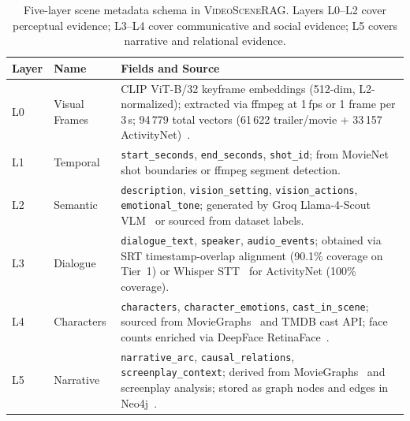 \documentclass[11pt]{article}
\newcommand{\system}{\textsc{VideoSceneRAG}}
\begin{document}
\begin{table}[!htb]
\centering
\begin{tabular}{%
  >{\raggedright\arraybackslash}p{1.2cm}
  >{\raggedright\arraybackslash}p{2.5cm}
  >{\raggedright\arraybackslash}p{7.9cm}}
\toprule
\textbf{Layer} & \textbf{Name} & \textbf{Fields and Source} \\
\midrule
L0 & Visual Frames   &
  CLIP ViT-B/32 keyframe embeddings (512-dim, L2-normalized); extracted
  via ffmpeg at 1\,fps or 1 frame per 3\,s; 94\,779 total vectors
  (61\,622 trailer/movie + 33\,157 ActivityNet)~\cite{clip,openclip}. \\[3pt]
L1 & Temporal        &
  \texttt{start\_seconds}, \texttt{end\_seconds}, \texttt{shot\_id}; from
  MovieNet~\cite{movienet} shot boundaries or ffmpeg segment detection. \\[3pt]
L2 & Semantic        &
  \texttt{description}, \texttt{vision\_setting}, \texttt{vision\_actions},
  \texttt{emotional\_tone}; generated by Groq Llama-4-Scout
  VLM~\cite{llava,blip2} or sourced from dataset labels. \\[3pt]
L3 & Dialogue        &
  \texttt{dialogue\_text}, \texttt{speaker}, \texttt{audio\_events}; obtained
  via SRT timestamp-overlap alignment (90.1\% coverage on Tier~1) or Whisper
  STT~\cite{whisper} for ActivityNet (100\% coverage). \\[3pt]
L4 & Characters      &
  \texttt{characters}, \texttt{character\_emotions},
  \texttt{cast\_in\_scene}; sourced from MovieGraphs~\cite{moviegraphs} and
  TMDB cast API; face counts enriched via DeepFace
  RetinaFace~\cite{retinaface}. \\[3pt]
L5 & Narrative       &
  \texttt{narrative\_arc}, \texttt{causal\_relations},
  \texttt{screenplay\_context}; derived from MovieGraphs~\cite{moviegraphs}
  and screenplay analysis; stored as graph nodes and edges in
  Neo4j~\cite{neo4j}. \\
\bottomrule
\end{tabular}
\caption{Five-layer scene metadata schema in \system.  Layers L0--L2 cover
perceptual evidence; L3--L4 cover communicative and social evidence; L5
covers narrative and relational evidence.}
\label{tab:layers}
\end{table}
\end{document}
